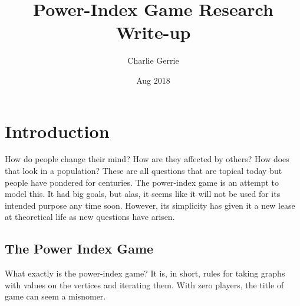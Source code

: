 \documentclass[12pt]{article}
\title{Power-Index Game Research Write-up}
\date{Aug 2018}
\author{Charlie Gerrie}
\theoremstyle{definition}
\theoremstyle{remark}
\theoremstyle{remark}
\begin{document}
\maketitle
\newpage


\tableofcontents

\section{Introduction} \label{IntroSec}

\par
How do people change their mind? How are they affected by others? How does that look in a population? These are all questions that are topical today but people have pondered for centuries. The power-index game is an attempt to model this. It had big goals, but alas, it seems like it will not be used for its intended purpose any time soon. However, its simplicity has given it a new lease at theoretical life as new questions have arisen. %

 

\subsection{The Power Index Game} \label{PIgame}

\par
What exactly is the power-index game? It is, in short, rules for taking graphs with values on the vertices and iterating them. With zero players, the title of game can seem a misnomer.


\end{document}
